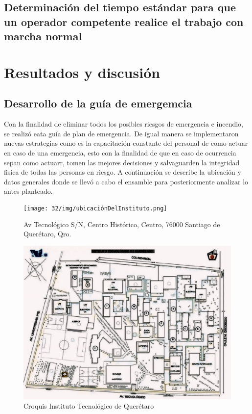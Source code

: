     \subsection{Determinación del tiempo estándar para que un operador competente realice el trabajo con marcha normal}
    
    
    
    
    

    


    
    \section{Resultados y discusión}
    \subsection{Desarrollo de la guía de emergemcia}
    
    Con la finalidad de eliminar todos los posibles riesgos de emergencia e incendio, se realizó eata guía de plan de emergencia. De igual manera se implementaron nuevas estrategias como es la capacitación constante del personal de como actuar en caso de una emergencia, esto con la finalidad de que en caso de ocurrencia sepan como actuarr, tomen las mejores decisiones y salvaguarden la integridad fisica de todas las personas en riesgo. 
    A continuación se describe la ubicación y datos generales donde se llevó a cabo el ensamble para posteriormente analizar lo antes planteado.
    \begin{figure}[H]
        \centering
        \texttt{[image: 32/img/ubicaciónDelInstituto.png]}
        \caption{Av Tecnológico S/N, Centro Histórico, Centro, 76000 Santiago de Querétaro, Qro.}
        \label{fig:enter-label}
    \end{figure}
    \begin{figure}[H]
        \centering
        \includegraphics[scale=0.2]{32/img/croquisITQ.jpg}
        \caption{Croquis Instituto Tecnológico de Querétaro}
        \label{fig:enter-label}
    \end{figure}
